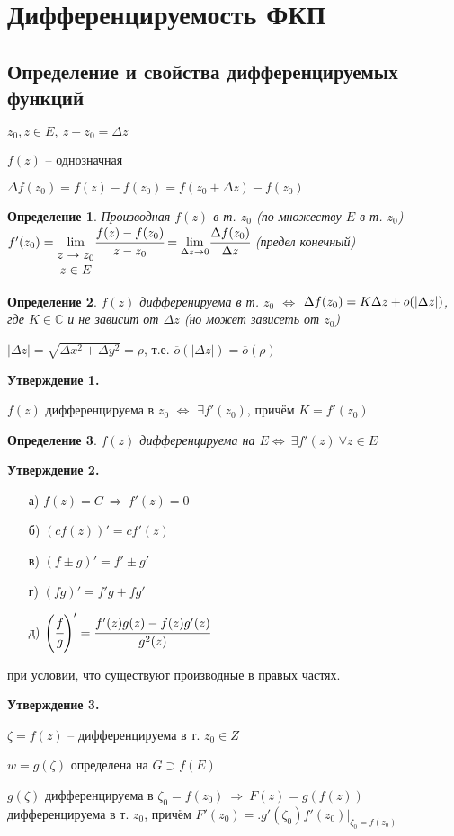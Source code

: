 \documentclass[draft]{article}
\newcommand{\then}{\ \Rightarrow\ }
\renewcommand{\C}{\mathbb{C}}
\newcommand{\mlim}[1]{\underset{#1}{\lim}}
\newcommand{\LRA}{\Leftrightarrow}
\newcommand{\D}{\Delta}
\renewcommand{\o}{\Bar{o}}
\newcommand{\mat}[1]{\begin{matrix}#1\end{matrix}}
\newcommand{\opr}[1]{\begin{opred}#1\end{opred}}
\newtheorem*{opred}{Определение}
\theoremstyle{remark}
\begin{document}
\newpage

\section{Дифференцируемость ФКП}

\subsection{Определение и свойства дифференцируемых функций}

$z_0,z\in E,\ z-z_0=\Delta z$

$f(z)$ -- однозначная

$\Delta f(z_0)=f(z)-f(z_0)=f(z_0+\Delta z)-f(z_0)$

\opr{Производная $f(z)$ в т. $z_0$ (по множеству $E$ в т. $z_0$) $f'(z_0)=\mlim{\mat{z\to z_0 \\ z\in E}}\cfrac{f(z)-f(z_0)}{z-z_0}=\mlim{\D z\to 0}\cfrac{\D f(z_0)}{\D z}$ (предел конечный)}

\opr{$f(z)$ дифференируема в т. $z_0$ $\LRA$ $\D f(z_0)=K\D z+\o(|\D z|)$, где $K\in\C$ и не зависит от $\D z$ (но может зависеть от $z_0$)}

$|\D z|=\sqrt{\D x^2+\D y^2}=\rho$, т.е. $\overline{o}(|\D z|)=\overline{o}(\rho)$

{\bfseries Утверждение 1.}

$f(z)$ дифференцируема в $z_0$ $\LRA$ $\exists f'(z_0)$, причём $K=f'(z_0)$

\opr{$f(z)$ дифференцируема на $E\LRA\ \exists f'(z)\ \forall z\in E$ }

{\bfseries Утверждение 2.}
\begin{itemize}
\item[а)] $f(z)=C\then f'(z)=0$
\item[б)] $(cf(z))'=cf'(z)$
\item[в)] $(f\pm g)'=f'\pm g'$
\item[г)] $(fg)'=f'g+fg'$
\item[д)] $\left(\cfrac fg\right)'=\cfrac{f'(z)g(z)-f(z)g'(z)}{g^2(z)}$
\end{itemize} при условии, что существуют производные в правых частях.

{\bfseries Утверждение 3.}

$\zeta=f(z)$ -- дифференцируема в т. $z_0\in Z$

$w=g(\zeta)$ определена на $G\supset f(E)$

$g(\zeta)$ дифференцируема в $\zeta_0=f(z_0)\then F(z)=g(f(z))$ дифференцируема в т. $z_0$, причём $F'(z_0)=\bigl.g'(\zeta_0)f'(z_0)\bigr|_{\zeta_0=f(z_0)}$
\end{document}
